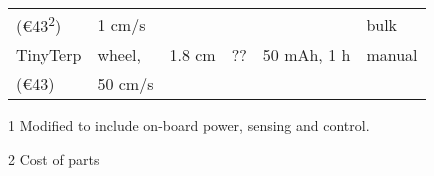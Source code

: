 \begin{table}[t]
{\begin{threeparttable}
\begin{tabular}{|l l l l l l|}
	 			(\euro43\textsuperscript{2}) & 1 cm/s            &        &    &              & bulk \\
	 			TinyTerp \cite{sabelhaus_icra_2013} & wheel, & 1.8 cm & ?? & 50 mAh, 1 h & manual \\
	 			(\euro43)                           &50 cm/s &        &    &             &        \\
				\hline
			\end{tabular}
			\begin{tablenotes}
				\small
				\item [1] Modified to include on-board power, sensing and control.
				\item [2] Cost of parts
			\end{tablenotes}
		\end{threeparttable}
	}
\end{table}